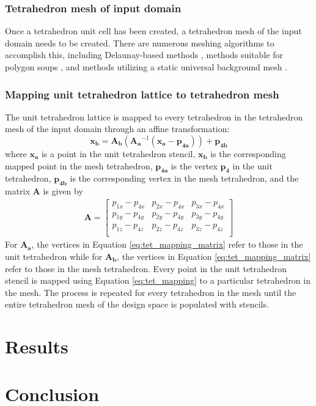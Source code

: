 \documentclass{article}
\begin{document}
\subsubsection{Tetrahedron mesh of input domain}
Once a tetrahedron unit cell has been created, a tetrahedron mesh of the input domain needs to be created. There are numerous meshing algorithms to accomplish this, including Delaunay-based methods \cite{shewchuk1998tetrahedral,si2010constrained,si2015tetgen}, methods suitable for polygon soups \cite{hu2018tetrahedral,hu2020fast}, and methods utilizing a static universal background mesh \cite{kabaria2017universal}.

\subsubsection{Mapping unit tetrahedron lattice to tetrahedron mesh}
The unit tetrahedron lattice is mapped to every tetrahedron in the tetrahedron mesh of the input domain through an affine transformation:
\begin{equation}
    \label{eq:tet_mapping}
    \mathbf{x_b} = \mathbf{A_b} \left( \mathbf{A_a}^{-1} \left( \mathbf{x_a} - \mathbf{p_{4a}} \right) \right) + \mathbf{p_{4b}}
\end{equation}
where $\mathbf{x_a}$ is a point in the unit tetrahedron stencil, $\mathbf{x_b}$ is the corresponding mapped point in the mesh tetrahedron, $\mathbf{p_{4a}}$ is the vertex $\mathbf{p_4}$ in the unit tetrahedron, $\mathbf{p_{4b}}$ is the corresponding vertex in the mesh tetrahedron, and the matrix $\mathbf{A}$ is given by
\begin{equation}
    \label{eq:tet_mapping_matrix}
    \begin{split}
        \mathbf{A} = \begin{bmatrix}
            p_{1x} - p_{4x} & p_{2x} - p_{4x} & p_{3x} - p_{4x} \\
            p_{1y} - p_{4y} & p_{2y} - p_{4y} & p_{3y} - p_{4y} \\
            p_{1z} - p_{4z} & p_{2z} - p_{4z} & p_{3z} - p_{4z} \\
        \end{bmatrix}
    \end{split}
\end{equation}
For $\mathbf{A_a}$, the vertices in Equation \ref{eq:tet_mapping_matrix} refer to those in the unit tetrahedron while for $\mathbf{A_b}$, the vertices in Equation \ref{eq:tet_mapping_matrix} refer to those in the mesh tetrahedron. Every point in the unit tetrahedron stencil is mapped using Equation \ref{eq:tet_mapping} to a particular tetrahedron in the mesh. The process is repeated for every tetrahedron in the mesh until the entire tetrahedron mesh of the design space is populated with stencils.

\section{Results}

\section{Conclusion}

\printbibliography
\end{document}

